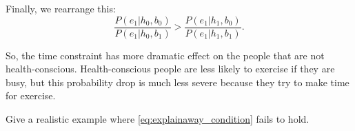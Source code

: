 \documentclass{discussion}
\begin{document}
Finally, we rearrange this:
\begin{equation}
\label{eq:explainaway_condition}
	\frac{P(e_1 | h_0, b_0)}{P(e_1 | h_0, b_1)} > \frac{P(e_1|h_1,b_0)}{P(e_1|h_1,b_1)}.
\end{equation}

So, the time constraint has more dramatic effect on the people that are not health-conscious. Health-conscious people are less likely to exercise if they are busy, but this probability drop is much less severe because they try to make time for exercise.

\begin{exercise}
	Give a realistic example where \eqref{eq:explainaway_condition} fails to hold.
\end{exercise}
\end{document}
